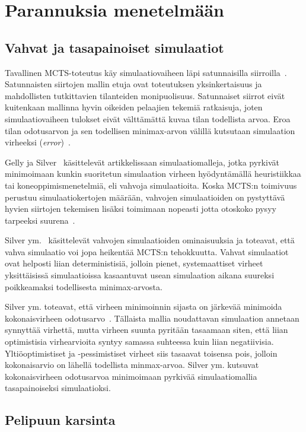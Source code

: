 \documentclass[12pt,finnish]{tktltiki2}
\theoremstyle{definition}
\theoremstyle{remark}
\begin{document}
\section{Parannuksia menetelmään}

\subsection{Vahvat ja tasapainoiset simulaatiot}

Tavallinen MCTS-toteutus käy simulaatiovaiheen läpi satunnaisilla siirroilla~\cite{browne}. Satunnaisten siirtojen mallin etuja ovat toteutuksen yksinkertaisuus ja mahdollisten tutkittavien tilanteiden monipuolisuus. Satunnaiset siirrot eivät kuitenkaan mallinna hyvin oikeiden pelaajien tekemiä ratkaisuja, joten simulaatiovaiheen tulokset eivät välttämättä kuvaa tilan todellista arvoa. Eroa tilan odotusarvon ja sen todellisen minimax-arvon välillä kutsutaan simulaation virheeksi (\textit{error})~\cite{silver}.

Gelly ja Silver~\cite{gellysilver} käsittelevät artikkelissaan simulaatiomalleja, jotka pyrkivät minimoimaan kunkin suoritetun simulaation virheen hyödyntämällä heuristiikkaa tai koneoppimismenetelmiä, eli vahvoja simulaatioita. Koska MCTS:n toimivuus perustuu simulaatiokertojen määrään, vahvojen simulaatioiden on pystyttävä hyvien siirtojen tekemisen lisäksi toimimaan nopeasti jotta otoskoko pysyy tarpeeksi suurena~\cite{browne}.

Silver ym.~\cite{silver} käsittelevät vahvojen simulaatioiden ominaisuuksia ja toteavat, että vahva simulaatio voi jopa heikentää MCTS:n tehokkuutta. Vahvat simulaatiot ovat helposti liian deterministisiä, jolloin pienet, systemaattiset virheet yksittäisissä simulaatioissa kasaantuvat usean simulaation aikana suureksi poikkeamaksi todellisesta minimax-arvosta.

Silver ym. toteavat, että virheen minimoinnin sijasta on järkevää minimoida kokonaisvirheen odotusarvo~\cite{silver}. Tällaista mallia noudattavan simulaation annetaan synnyttää virhettä, mutta virheen suunta pyritään tasaamaan siten, että liian optimistisia virhearvioita syntyy samassa suhteessa kuin liian negatiivisia. Yltiöoptimistiset ja -pessimistiset virheet siis tasaavat toisensa pois, jolloin kokonaisarvio on lähellä todellista minmax-arvoa. Silver ym. kutsuvat kokonaisvirheen odotusarvoa minimoimaan pyrkivää simulaatiomallia tasapainoiseksi simulaatioksi.


\subsection{Pelipuun karsinta}
\end{document}

